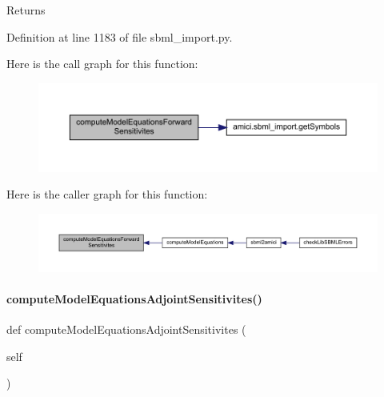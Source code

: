 \begin{DoxyReturn}{Returns}

\end{DoxyReturn}


Definition at line 1183 of file sbml\+\_\+import.\+py.

Here is the call graph for this function\+:
\nopagebreak
\begin{figure}[H]
\begin{center}
\leavevmode
\includegraphics[width=350pt]{classamici_1_1sbml__import_1_1_sbml_importer_a37b86397a43aca4fa926c6cfe6831f77_cgraph}
\end{center}
\end{figure}
Here is the caller graph for this function\+:
\nopagebreak
\begin{figure}[H]
\begin{center}
\leavevmode
\includegraphics[width=350pt]{classamici_1_1sbml__import_1_1_sbml_importer_a37b86397a43aca4fa926c6cfe6831f77_icgraph}
\end{center}
\end{figure}
\mbox{\label{classamici_1_1sbml__import_1_1_sbml_importer_a3a4c18dff314f187d61553ee60a7c45e}} 
\paragraph{\texorpdfstring{compute\+Model\+Equations\+Adjoint\+Sensitivites()}{computeModelEquationsAdjointSensitivites()}}
{\footnotesize\ttfamily def compute\+Model\+Equations\+Adjoint\+Sensitivites (\begin{DoxyParamCaption}\item[{}]{self }\end{DoxyParamCaption})}

